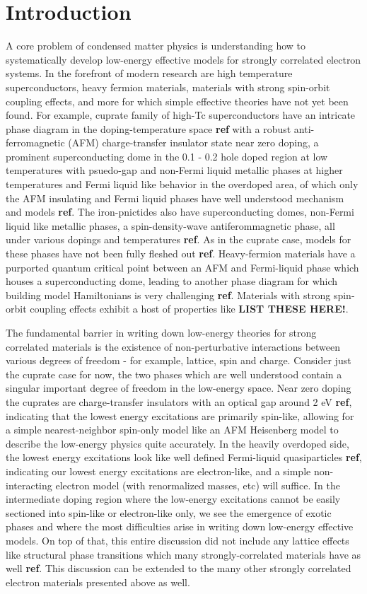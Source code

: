 \documentclass{article}
\begin{document}
\section{Introduction}
A core problem of condensed matter physics is understanding how to systematically develop low-energy effective models for strongly correlated electron systems. In the forefront of modern research are high temperature superconductors, heavy fermion materials, materials with strong spin-orbit coupling effects, and more for which simple effective theories have not yet been found. For example, cuprate family of high-Tc superconductors have an intricate phase diagram in the doping-temperature space \textbf{ref} with a robust anti-ferromagnetic (AFM) charge-transfer insulator state near zero doping, a prominent superconducting dome in the 0.1 - 0.2 hole doped region at low temperatures with psuedo-gap and non-Fermi liquid metallic phases at higher temperatures and Fermi liquid like behavior in the overdoped area, of which only the AFM insulating and Fermi liquid phases have well understood mechanism and models \textbf{ref}. The iron-pnictides also have superconducting domes, non-Fermi liquid like metallic phases, a spin-density-wave antiferommagnetic phase, all under various dopings and temperatures \textbf{ref}. As in the cuprate case, models for these phases have not been fully fleshed out \textbf{ref}. Heavy-fermion materials have a purported quantum critical point between an AFM and Fermi-liquid phase which houses a superconducting dome, leading to another phase diagram for which building model Hamiltonians is very challenging \textbf{ref}. Materials with strong spin-orbit coupling effects exhibit a host of properties like \textbf{LIST THESE HERE!}. 

The fundamental barrier in writing down low-energy theories for strong correlated materials is the existence of non-perturbative interactions between various degrees of freedom - for example, lattice, spin and charge. Consider just the cuprate case for now, the two phases which are well understood contain a singular important degree of freedom in the low-energy space. Near zero doping the cuprates are charge-transfer insulators with an optical gap around 2 eV \textbf{ref}, indicating that the lowest energy excitations are primarily spin-like, allowing for a simple nearest-neighbor spin-only model like an AFM Heisenberg model to describe the low-energy physics quite accurately. In the heavily overdoped side, the lowest energy excitations look like well defined Fermi-liquid quasiparticles \textbf{ref}, indicating our lowest energy excitations are electron-like, and a simple non-interacting electron model (with renormalized masses, etc) will suffice. In the intermediate doping region where the low-energy excitations cannot be easily sectioned into spin-like or electron-like only, we see the emergence of exotic phases and where the most difficulties arise in writing down low-energy effective models. On top of that, this entire discussion did not include any lattice effects like structural phase transitions which many strongly-correlated materials have as well \textbf{ref}. This discussion can be extended to the many other strongly correlated electron materials presented above as well.
\end{document}

